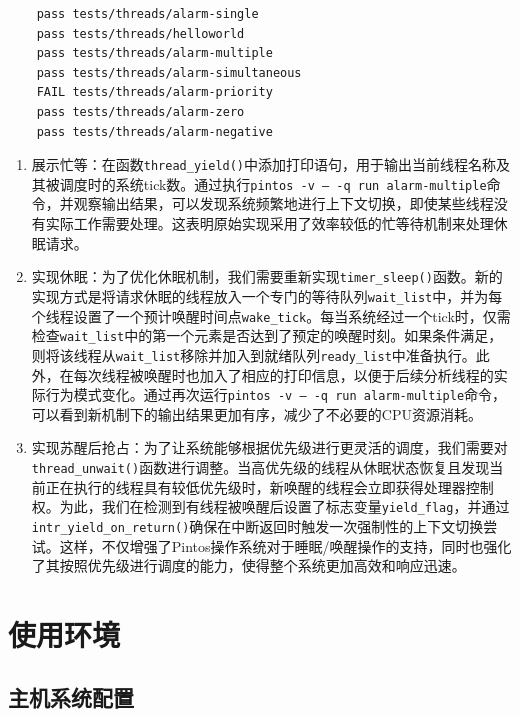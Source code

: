 \documentclass{article}
\begin{document}
\begin{lstlisting}
	pass tests/threads/alarm-single
	pass tests/threads/helloworld
	pass tests/threads/alarm-multiple
	pass tests/threads/alarm-simultaneous
	FAIL tests/threads/alarm-priority
	pass tests/threads/alarm-zero
	pass tests/threads/alarm-negative
\end{lstlisting}

\begin{enumerate}
	\item 展示忙等：在函数\texttt{thread\_yield()}中添加打印语句，用于输出当前线程名称及其被调度时的系统tick数。通过执行\texttt{pintos -v -- -q run alarm-multiple}命令，并观察输出结果，可以发现系统频繁地进行上下文切换，即使某些线程没有实际工作需要处理。这表明原始实现采用了效率较低的忙等待机制来处理休眠请求。
	
	\item 实现休眠：为了优化休眠机制，我们需要重新实现\texttt{timer\_sleep()}函数。新的实现方式是将请求休眠的线程放入一个专门的等待队列\texttt{wait\_list}中，并为每个线程设置了一个预计唤醒时间点\texttt{wake\_tick}。每当系统经过一个tick时，仅需检查\texttt{wait\_list}中的第一个元素是否达到了预定的唤醒时刻。如果条件满足，则将该线程从\texttt{wait\_list}移除并加入到就绪队列\texttt{ready\_list}中准备执行。此外，在每次线程被唤醒时也加入了相应的打印信息，以便于后续分析线程的实际行为模式变化。通过再次运行\texttt{pintos -v -- -q run alarm-multiple}命令，可以看到新机制下的输出结果更加有序，减少了不必要的CPU资源消耗。
	
	\item 实现苏醒后抢占：为了让系统能够根据优先级进行更灵活的调度，我们需要对\texttt{thread\_unwait()}函数进行调整。当高优先级的线程从休眠状态恢复且发现当前正在执行的线程具有较低优先级时，新唤醒的线程会立即获得处理器控制权。为此，我们在检测到有线程被唤醒后设置了标志变量\texttt{yield\_flag}，并通过\texttt{intr\_yield\_on\_return()}确保在中断返回时触发一次强制性的上下文切换尝试。这样，不仅增强了Pintos操作系统对于睡眠/唤醒操作的支持，同时也强化了其按照优先级进行调度的能力，使得整个系统更加高效和响应迅速。
\end{enumerate}

\normalsize

\section{使用环境}

\subsection{主机系统配置}
\end{document}
